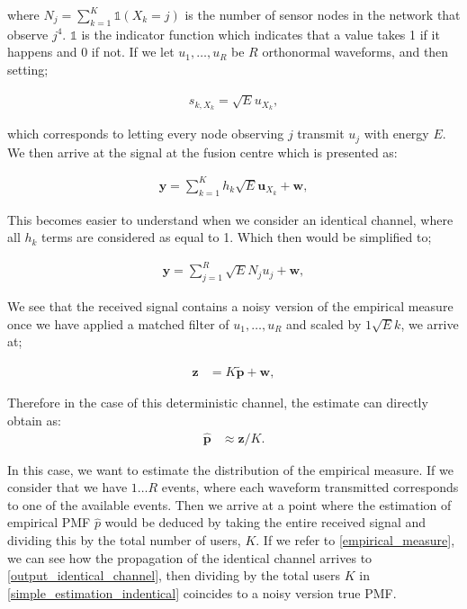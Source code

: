 \documentclass{article}
\begin{document}
where $N_j =\sum_{k=1}^K \mathbb{1}(X_k = j)$ is the number of sensor nodes in the network that observe $j^4$. $\mathbb{1}$ is the indicator function which indicates that a value takes 1 if it happens and 0 if not. If we let $u_1,\dots,u_R$ be $R$ orthonormal waveforms, and then setting;

\begin{align}
    s_{k,X_k} = \sqrt{E}u_{X_k}, 
\end{align}

which corresponds to letting every node observing $j$ transmit $u_j$ with energy $E$.  We then arrive at the signal at the fusion centre which is presented as:

\begin{align}
    \boldsymbol{y} = \sum_{k=1}^K h_k  \sqrt{E}\boldsymbol{u}_{X_k} + \boldsymbol{w}, \label{eq:system_model}
\end{align}

This becomes easier to understand when we consider an identical channel, where all $h_k$ terms are considered as equal to 1. Which then would be simplified to;

\begin{align}
    \boldsymbol{y} = \sum_{j=1}^R \sqrt{E}N_j u_{j} + \boldsymbol{w}, \label{eq:simplified_system_model}
\end{align}

We see that the received signal contains a noisy version of the empirical measure once we have applied a matched filter of $u_1,\dots,u_R$ and scaled by $1\sqrt{E}k$, we arrive at;

%
\begin{align}
    \boldsymbol{z} &= K \tilde{\boldsymbol{p}} + \boldsymbol{w}, 
    \label{output_identical_channel}
\end{align}

Therefore in the case of this deterministic channel, the estimate can directly obtain as:
%
\begin{align}
    \boldsymbol{\hat{p}} &\approx \boldsymbol{z} / K.
    \label{simple_estimation_indentical}
\end{align}

In this case, we want to estimate the distribution of the empirical measure. If we consider that we have $1 \dots R$ events, where each waveform transmitted corresponds to one of the available events. Then we arrive at a point where the estimation of empirical \ac{PMF} $\hat{p}$ would be deduced by taking the entire received signal and dividing this by the total number of users, $K$. If we refer to \eqref{empirical_measure}, we can see how the propagation of the identical channel arrives to \eqref{output_identical_channel}, then dividing by the total users $K$ in \eqref{simple_estimation_indentical} coincides to a noisy version true \ac{PMF}.
\end{document}
